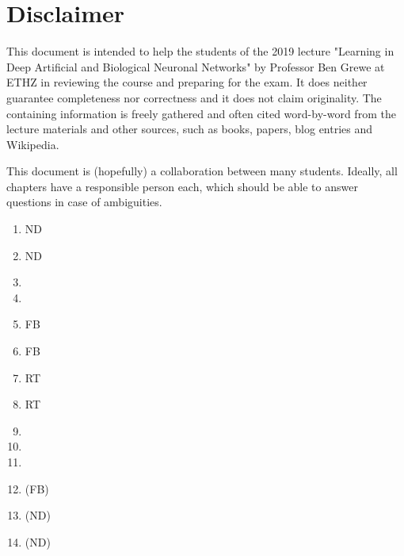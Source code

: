 \documentclass[main]{subfiles}
\begin{document}
\newpage
\section{Disclaimer}
This document is intended to help the students of the 2019 lecture "Learning in Deep Artificial and Biological Neuronal Networks" by Professor Ben Grewe at ETHZ in reviewing the course and preparing for the exam. It does neither guarantee completeness nor correctness and it does not claim originality. The containing information is freely gathered and often cited word-by-word from the lecture materials and other sources, such as books, papers, blog entries and Wikipedia.

This document is (hopefully) a collaboration between many students. Ideally, all chapters have a responsible person each, which should be able to answer questions in case of ambiguities. 
\begin{enumerate}
    \item ND
    \item ND
    \item
    \item
    \item FB
    \item FB
    \item RT
    \item RT
    \item
    \item
    \item
    \item (FB)
    \item (ND)
    \item (ND)
    
\end{enumerate}
\end{document}
